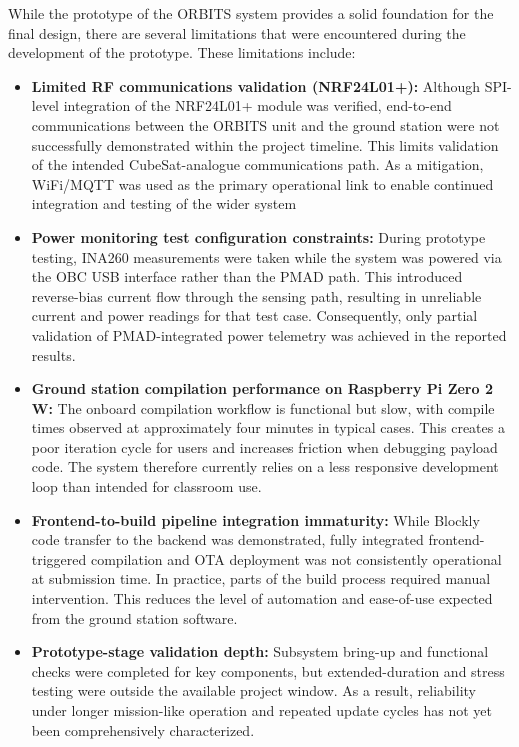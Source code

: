 \documentclass[a4paper,12pt,titlepage]{report}
\begin{document}
While the prototype of the ORBITS system provides a solid foundation for the final design, there are several limitations that were encountered during the development of the prototype. These limitations include:
\begin{itemize}
\item \textbf{Limited RF communications validation (NRF24L01+):}
Although SPI-level integration of the NRF24L01+ module was verified, end-to-end communications between the ORBITS unit and the ground station were not successfully demonstrated within the project timeline. This limits validation of the intended CubeSat-analogue communications path. As a mitigation, WiFi/MQTT was used as the primary operational link to enable continued integration and testing of the wider system
\item \textbf{Power monitoring test configuration constraints:}  
During prototype testing, INA260 measurements were taken while the system was powered via the OBC USB interface rather than the PMAD path. This introduced reverse-bias current flow through the sensing path, resulting in unreliable current and power readings for that test case. Consequently, only partial validation of PMAD-integrated power telemetry was achieved in the reported results.

\item \textbf{Ground station compilation performance on Raspberry Pi Zero 2 W:}  
The onboard compilation workflow is functional but slow, with compile times observed at approximately four minutes in typical cases. This creates a poor iteration cycle for users and increases friction when debugging payload code. The system therefore currently relies on a less responsive development loop than intended for classroom use.

\item \textbf{Frontend-to-build pipeline integration immaturity:}  
While Blockly code transfer to the backend was demonstrated, fully integrated frontend-triggered compilation and OTA deployment was not consistently operational at submission time. In practice, parts of the build process required manual intervention. This reduces the level of automation and ease-of-use expected from the ground station software.

\item \textbf{Prototype-stage validation depth:}  
Subsystem bring-up and functional checks were completed for key components, but extended-duration and stress testing were outside the available project window. As a result, reliability under longer mission-like operation and repeated update cycles has not yet been comprehensively characterized.


\end{itemize}
\end{document}
